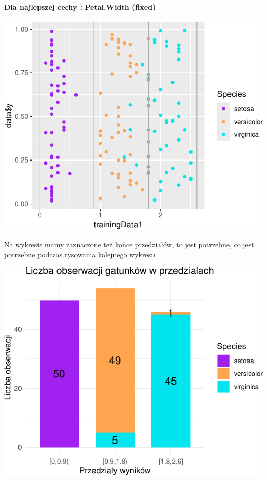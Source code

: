 \documentclass[
  12pt,
]{article}
\begin{document}
\paragraph{Dla najlepszej cechy : Petal.Width
(fixed)}\label{dla-najlepszej-cechy-petal.width-fixed}

\begin{center}\includegraphics{Sprawozdanie2_files/figure-latex/givenRanges_najl-1} \end{center}

Na wykresie mamy zaznaczone też końce przedziałów, to jest potrzebne, co
jest potrzebne podczas rysowania kolejnego wykresu

\begin{center}\includegraphics{Sprawozdanie2_files/figure-latex/tabela_kondygnacji_4_najl-1} \end{center}
\end{document}
